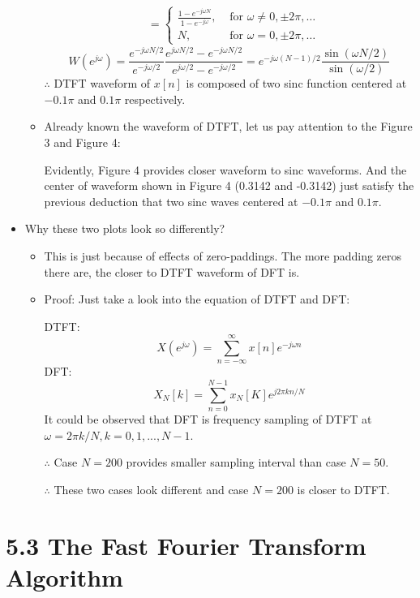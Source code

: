 \documentclass[onecolumn,oneside]{SUSTechHomework}
\begin{document}
\begin{itemize}
\begin{itemize}
$$\begin{aligned}
				&=\left\{\begin{array}{ll}\frac{1-e^{-j \omega N}}{1-e^{-j \omega}}, & \text { for } \omega \neq 0, \pm 2 \pi, \ldots 
					\\N, & \text { for } \omega=0, \pm 2 \pi, \ldots\end{array}\right.
			\end{aligned}
			$$
			$$
			W\left(e^{j \omega}\right)=\frac{e^{-j \omega N / 2}}{e^{-j \omega / 2}} \frac{e^{j \omega N / 2}-e^{-j \omega N / 2}}{e^{j \omega / 2}-e^{-j \omega / 2}}
			=e^{-j \omega(N-1) / 2} \frac{\sin (\omega N / 2)}{\sin (\omega / 2)}
			$$
			$\therefore$ DTFT waveform of $x[n]$ is composed of two sinc function centered at $-0.1\pi$ and $0.1\pi$ respectively.
			\item Already known the waveform of DTFT, let us pay attention to the Figure 3 and Figure 4:\par
			Evidently, Figure 4 provides closer waveform to sinc waveforms. And the center of waveform shown in
			Figure 4 (0.3142 and -0.3142) just satisfy the previous deduction that two sinc waves centered at $-0.1\pi$ and $0.1\pi$.
		\end{itemize}
		\item Why these two plots look so differently?
		\begin{itemize}
			\item This is just because of effects of zero-paddings. The more padding zeros there are, the closer to
			DTFT waveform of DFT is.
			\item Proof: Just take a look into the equation of DTFT and DFT:\par
			DTFT:
			$$
			X(e^{j\omega})=\sum_{n=-\infty}^{\infty}x[n]e^{-j\omega n}
			$$
			DFT:
			$$
			X_N[k]=\sum_{n=0}^{N-1}x_N[K]e^{j2\pi kn/N}
			$$
			It could be observed that DFT is frequency sampling of DTFT at $\omega=2\pi k/N, k=0,1,...,N-1$.\par
			$\therefore$ Case $N=200$ provides smaller sampling interval than case $N=50$.\par
			$\therefore$ These two cases look different and case $N=200$ is closer to DTFT.
		\end{itemize}         
\end{itemize}
\section*{5.3 The Fast Fourier Transform Algorithm}
\end{document}
